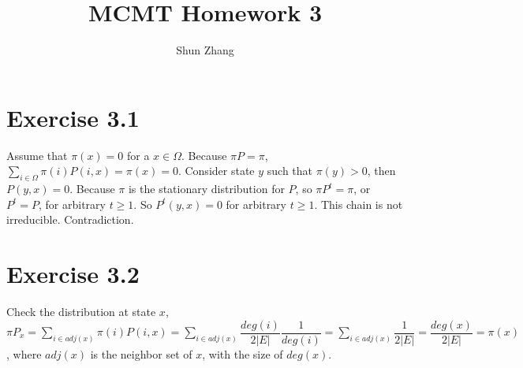 \documentclass[10pt]{article}
\title{MCMT Homework 3}
\author{Shun Zhang}
\date{}
\begin{document}
\maketitle

\section*{Exercise 3.1}

Assume that $\pi(x) = 0$ for a $x \in \Omega$. Because $\pi P = \pi$, $\sum_{i
\in \Omega} \pi(i) P(i, x) = \pi(x) = 0$. Consider state $y$ such that $\pi(y) >
0$, then $P(y, x) = 0$. Because $\pi$ is the stationary distribution for $P$, so
$\pi P^t = \pi$, or $P^t = P$, for arbitrary $t \geq 1$. So $P^t(y, x) = 0$ for
arbitrary $t \geq 1$. This chain is not irreducible. Contradiction.

\section*{Exercise 3.2}

Check the distribution at state $x$,
$\pi P_x = \sum_{i \in adj(x)} \pi(i) P(i, x) = \sum_{i \in adj(x)}
\dfrac{deg(i)}{2|E|} \dfrac{1}{deg(i)} = \sum_{i \in adj(x)} \dfrac{1}{2|E|}
= \dfrac{deg(x)}{2|E|}
= \pi(x)
$, where $adj(x)$ is the neighbor set of $x$, with the size of $deg(x)$.
\end{document}
